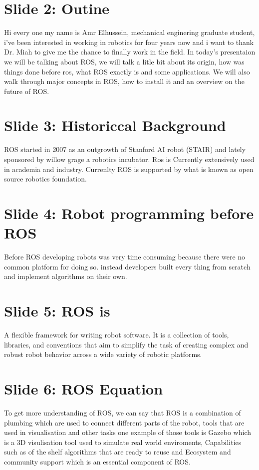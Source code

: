 \documentclass[
12pt,draftcls,onecolumn%
]{IEEEtran}
\begin{document}


\section{Slide 2: Outine}
Hi every one my name is Amr Elhussein, mechanical enginering graduate student, i've been interested in working in robotics for four years now and i want to thank Dr. Miah to give me the chance to finally work in the field. 
In today's presentaion we will be talking about ROS, we will talk a litle bit about its origin, how was things done before ros, what ROS exactly is and some applications. 
We will also walk through major concepts in ROS, how to install it and an overview on the future of ROS.
\section{Slide 3: Historiccal Background}
ROS started in 2007 as an outgrowth of Stanford AI robot (STAIR) and lately sponsored by willow grage a robotics incubator. 
Ros is Currently extensively used in academia and industry. Currenlty ROS is supported by what is known as open source robotics foundation. 
\section{Slide 4: Robot programming before ROS}
Before ROS developing robots was very time consuming because there were no common platform for doing so. instead developers built every thing from scratch and implement algorithms on their own. 
\section{Slide 5: ROS is } 
A flexible framework for writing robot software. It is a collection of tools,
libraries, and conventions that aim to simplify the task of creating complex
and robust robot behavior across a wide variety of robotic platforms.
\section{Slide 6: ROS Equation}
To get more understanding of ROS, we can say that ROS is a combination of plumbing which are used to connect different parts of the robot, tools that are used in visualisation and other tasks one example of those tools is Gazebo which is a 3D visulisation tool used to simulate real world enviroments, Capabilities such as of the shelf algorithms that are ready to reuse and Ecosystem and community support which is an essential component of ROS.
\end{document}
